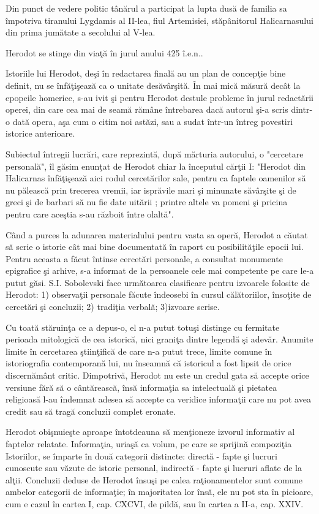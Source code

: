 Din punct de vedere politic tânărul a participat la lupta dusă de familia sa împotriva tiranului Lygdamis al II-lea, fiul Artemisiei, stăpânitorul Halicarnasului din prima jumătate a secolului al V-lea.

Herodot se stinge din viaţă în jurul anului 425 î.e.n..

Istoriile lui Herodot, deşi în redactarea finală au un plan de concepţie bine definit, nu se înfăţişează ca o unitate desăvârşită. În mai mică măsură decât la epopeile homerice, s-au ivit şi pentru Herodot destule probleme în jurul redactării operei, din care cea mai de seamă rămâne întrebarea dacă autorul şi-a scris dintr-o dată opera, aşa cum o citim noi astăzi, sau a sudat într-un întreg povestiri istorice anterioare.

Subiectul întregii lucrări, care reprezintă, după mărturia autorului, o "cercetare personală", îl găsim enunţat de Herodot chiar la începutul cărţii I: "Herodot din Halicarnas înfăţişează aici rodul cercetărilor sale, pentru ca faptele oamenilor să nu pălească prin trecerea vremii, iar isprăvile mari şi minunate săvârşite şi de greci şi de barbari să nu fie date uitării ; printre altele va pomeni şi pricina pentru care aceştia s-au războit între olaltă".

Când a purces la adunarea materialului pentru vasta sa operă, Herodot a căutat să scrie o istorie cât mai bine documentată în raport cu posibilităţile epocii lui. Pentru aceasta a făcut întinse cercetări personale, a consultat monumente epigrafice şi arhive, s-a informat de la persoanele cele mai competente pe care le-a putut găsi. S.I. Sobolevski face următoarea clasificare pentru izvoarele folosite de Herodot: 1) observaţii personale făcute îndeosebi în cursul călătoriilor, însoţite de cercetări şi concluzii; 2) tradiţia verbală; 3)izvoare scrise.

Cu toată stăruinţa ce a depus-o, el n-a putut totuşi distinge cu fermitate perioada mitologică de cea istorică, nici graniţa dintre legendă şi adevăr. Anumite limite în cercetarea ştiinţifică de care n-a putut trece, limite comune în istoriografia contemporană lui, nu înseamnă că istoricul a fost lipsit de orice discernământ critic. Dimpotrivă, Herodot nu este un credul gata să accepte orice versiune fără să o cântărească, însă informaţia sa intelectuală şi pietatea religioasă l-au îndemnat adesea să accepte ca veridice informaţii care nu pot avea credit sau să tragă concluzii complet eronate.

Herodot obişnuieşte aproape întotdeauna să menţioneze izvorul informativ al faptelor relatate. Informaţia, uriaşă ca volum, pe care se sprijină compoziţia Istoriilor, se împarte în două categorii distincte: directă - fapte şi lucruri cunoscute sau văzute de istoric personal, indirectă - fapte şi lucruri aflate de la alţii. Concluzii deduse de Herodot însuşi pe calea raţionamentelor sunt comune ambelor categorii de informaţie; în majoritatea lor însă, ele nu pot sta în picioare, cum e cazul în cartea I, cap. CXCVI, de pildă, sau în cartea a II-a, cap. XXIV.

